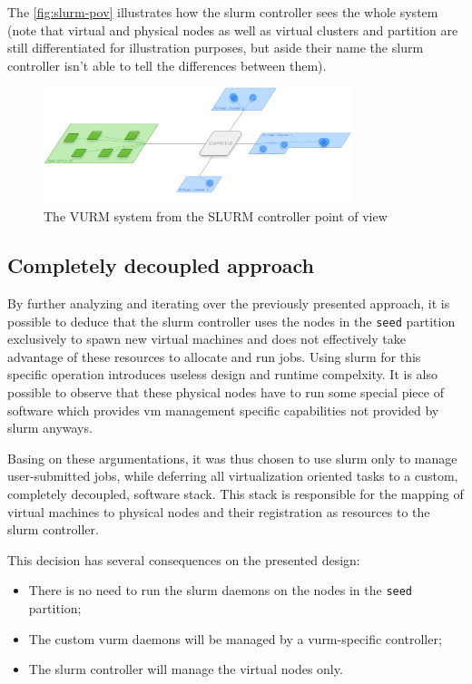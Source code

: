 The \autoref{fig:slurm-pov} illustrates how the \gls{slurm} controller sees the whole system (note that virtual and physical nodes as well as virtual clusters and partition are still differentiated for illustration purposes, but aside their name the \gls{slurm} controller isn't able to tell the differences between them).

\begin{figure}[ht]
	\centering
	\includegraphics[width=0.8\textwidth]{figures/slurm-pov}
	\caption{The VURM system from the SLURM controller point of view}
	\label{fig:slurm-pov}
\end{figure}


\subsection{Completely decoupled approach}

By further analyzing and iterating over the previously presented approach, it is possible to deduce that the \gls{slurm} controller uses the nodes in the \texttt{seed} partition exclusively to spawn new virtual machines and does not effectively take advantage of these resources to allocate and run jobs. Using \gls{slurm} for this specific operation introduces useless design and runtime compelxity. It is also possible to observe that these physical nodes have to run some special piece of software which provides \gls{vm} management specific capabilities not provided by \gls{slurm} anyways.

Basing on these argumentations, it was thus chosen to use \gls{slurm} only to manage user-submitted jobs, while deferring all virtualization oriented tasks to a custom, completely decoupled, software stack. This stack is responsible for the mapping of virtual machines to physical nodes and their registration as resources to the \gls{slurm} controller.

This decision has several consequences on the presented design:

\begin{itemize}
	\item There is no need to run the \gls{slurm} daemons on the nodes in the \texttt{seed} partition;
	\item The custom \gls{vurm} daemons will be managed by a \gls{vurm}-specific controller;
	\item The \gls{slurm} controller will manage the virtual nodes only.
\end{itemize}


